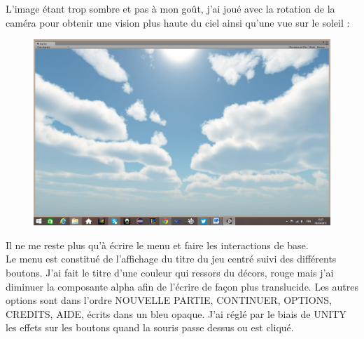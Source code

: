 \documentclass[a4paper]{article}
\begin{document}
\pagebreak
L’image étant trop sombre et pas à mon goût, j’ai joué avec la rotation de la caméra pour obtenir une vision plus haute du ciel ainsi qu’une vue sur le soleil :
\begin{figure}[h]
\begin{center}
\includegraphics[width=1\textwidth]{sky2.png}
\end{center}
\end{figure}
Il ne me reste plus qu’à écrire le menu et faire les interactions de base.\\
	Le menu est constitué de l’affichage du titre du jeu centré suivi des différents boutons. J’ai fait le titre d’une couleur qui ressors du décors, rouge mais j’ai diminuer la composante alpha afin de l’écrire de façon plus translucide. Les autres options sont dans l’ordre NOUVELLE PARTIE, CONTINUER, OPTIONS, CREDITS, AIDE, écrits dans un bleu opaque. J’ai réglé par le biais de UNITY les effets sur les boutons quand la souris passe dessus ou est cliqué.
    
\end{document}
